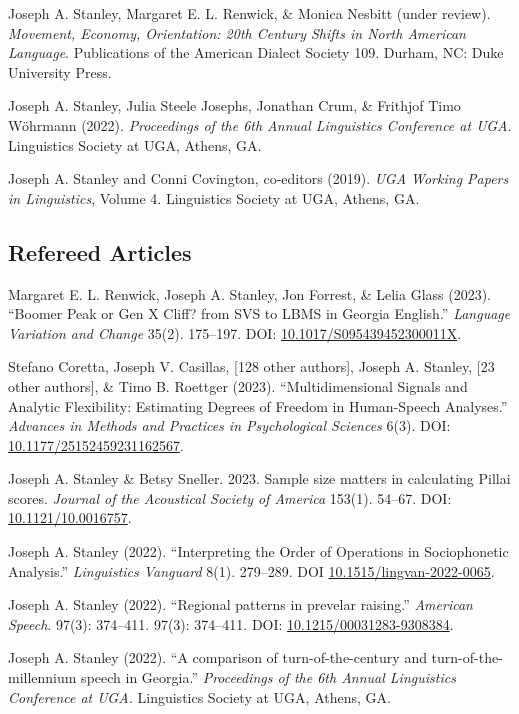 \documentclass[
]{article}
\begin{document}
{Joseph A. Stanley}, Margaret E. L. Renwick, \& Monica Nesbitt (under
review). \emph{Movement, Economy, Orientation: 20th Century Shifts in
North American Language}. Publications of the American Dialect Society
109. Durham, NC: Duke University Press.

{Joseph A. Stanley}, Julia Steele Josephs, Jonathan Crum, \& Frithjof
Timo Wöhrmann (2022). \emph{Proceedings of the 6th Annual Linguistics
Conference at UGA}. Linguistics Society at UGA, Athens, GA.

{Joseph A. Stanley} and Conni Covington, co-editors (2019). \emph{UGA
Working Papers in Linguistics}, Volume 4. Linguistics Society at UGA,
Athens, GA.

\hypertarget{refereed-articles}{%
\subsection{Refereed Articles}\label{refereed-articles}}

Margaret E. L. Renwick, {Joseph A. Stanley}, Jon Forrest, \& Lelia Glass
(2023). ``Boomer Peak or Gen X Cliff? from SVS to LBMS in Georgia
English.'' \emph{Language Variation and Change} 35(2). 175--197. DOI:
\href{https://doi.org/10.1017/S095439452300011X}{10.1017/S095439452300011X}.

Stefano Coretta, Joseph V. Casillas, {[}128 other authors{]}, {Joseph A.
Stanley}, {[}23 other authors{]}, \& Timo B. Roettger (2023).
``Multidimensional Signals and Analytic Flexibility: Estimating Degrees
of Freedom in Human-Speech Analyses.'' \emph{Advances in Methods and
Practices in Psychological Sciences} 6(3). DOI:
\href{https://doi.org/10.1177/25152459231162567}{10.1177/25152459231162567}.

{Joseph A. Stanley} \& Betsy Sneller. 2023. Sample size matters in
calculating Pillai scores. \emph{Journal of the Acoustical Society of
America} 153(1). 54--67. DOI:
\href{https://asa.scitation.org/doi/pdf/10.1121/10.0016757}{10.1121/10.0016757}.

{Joseph A. Stanley} (2022). ``Interpreting the Order of Operations in
Sociophonetic Analysis.'' \emph{Linguistics Vanguard} 8(1). 279--289.
DOI
\href{https://doi.org/10.1515/lingvan-2022-0065}{10.1515/lingvan-2022-0065}.

{Joseph A. Stanley} (2022). ``Regional patterns in prevelar raising.''
\emph{American Speech}. 97(3): 374--411. 97(3): 374--411. DOI:
\href{http://doi.org/10.1215/00031283-9308384}{10.1215/00031283-9308384}.

{Joseph A. Stanley} (2022). ``A comparison of turn-of-the-century and
turn-of-the-millennium speech in Georgia.'' \emph{Proceedings of the 6th
Annual Linguistics Conference at UGA.} Linguistics Society at UGA,
Athens, GA.
\end{document}
